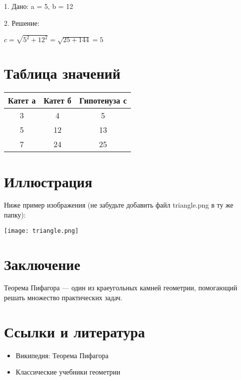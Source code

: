 \documentclass{article}
\begin{document}
1. Дано: a = 5, b = 12

2. Решение:
\begin{center}

  \text $ c = \sqrt{5^2 + 12^2} = \sqrt{25 + 144} = 5$
\end{center}
\section{Таблица значений}
\begin{center}
\begin{tabular}{|c|c|c|}
\hline
Катет а & Катет б & Гипотенуза с \\
\hline
3 & 4 & 5 \\
\hline
5 & 12 & 13 \\
\hline
7 & 24 & 25 \\
\hline
\end{tabular}
\end{center}

\section{Иллюстрация}
Ниже пример изображения (не забудьте добавить файл triangle.png в ту же папку):

\begin{center}
\texttt{[image: triangle.png]}
\end{center}


\section{Заключение}

Теорема Пифагора — один из краеугольных камней геометрии, помогающий решать
множество практических задач.


\section{Ссылки и литература}
\begin{itemize}
    \item Википедия: Теорема Пифагора
    \item Классические учебники геометрии

\end{itemize}
\end{document}
